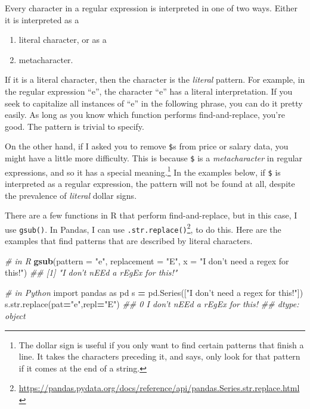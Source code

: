 \documentclass[12pt,krantz2]{krantz}
\makeatletter
\newenvironment{Shaded}{\begin{snugshade}}{\end{snugshade}}
\newcommand{\BuiltInTok}[1]{#1}
\newcommand{\CommentTok}[1]{\textcolor[rgb]{0.37,0.37,0.37}{\textit{#1}}}
\newcommand{\DataTypeTok}[1]{\textcolor[rgb]{0.27,0.27,0.27}{#1}}
\newcommand{\ImportTok}[1]{#1}
\newcommand{\KeywordTok}[1]{\textcolor[rgb]{0.27,0.27,0.27}{\textbf{#1}}}
\newcommand{\NormalTok}[1]{#1}
\newcommand{\OperatorTok}[1]{\textcolor[rgb]{0.43,0.43,0.43}{\textbf{#1}}}
\newcommand{\StringTok}[1]{\textcolor[rgb]{0.5,0.5,0.5}{#1}}
\providecommand{\tightlist}{%
  \setlength{\itemsep}{0pt}\setlength{\parskip}{0pt}}
\renewcommand{\href}[2]{#2\footnote{\url{#1}}}
\newenvironment{kframe}{%
\medskip{}
\setlength{\fboxsep}{.8em}
 \def\at@end@of@kframe{}%
 \ifinner\ifhmode%
  \def\at@end@of@kframe{\end{minipage}}%
  \begin{minipage}{\columnwidth}%
 \fi\fi%
 \def\FrameCommand##1{\hskip\@totalleftmargin \hskip-\fboxsep
 \colorbox{shadecolor}{##1}\hskip-\fboxsep
     \hskip-\linewidth \hskip-\@totalleftmargin \hskip\columnwidth}%
 \MakeFramed {\advance\hsize-\width
   \@totalleftmargin\z@ \linewidth\hsize
   \@setminipage}}%
 {\par\unskip\endMakeFramed%
 \at@end@of@kframe}
\renewenvironment{Shaded}{\begin{kframe}}{\end{kframe}}
\makeatother
\begin{document}
Every character in a regular expression is interpreted in one of two ways. Either it is interpreted as a

\begin{enumerate}
\def\labelenumi{\arabic{enumi}.}
\tightlist
\item
  literal character, or as a
\item
  metacharacter.
\end{enumerate}

If it is a literal character, then the character is the \emph{literal} pattern. For example, in the regular expression ``e'', the character ``e'' has a literal interpretation. If you seek to capitalize all instances of ``e'' in the following phrase, you can do it pretty easily. As long as you know which function performs find-and-replace, you're good. The pattern is trivial to specify.

On the other hand, if I asked you to remove \texttt{\$}s from price or salary data, you might have a little more difficulty. This is because \texttt{\$} is a \emph{metacharacter} in regular expressions, and so it has a special meaning.\footnote{The dollar sign is useful if you only want to find certain patterns that finish a line. It takes the characters preceding it, and says, only look for that pattern if it comes at the end of a string.} In the examples below, if \texttt{\$} is interpreted as a regular expression, the pattern will not be found at all, despite the prevalence of \emph{literal} dollar signs.

There are a few functions in R that perform find-and-replace, but in this case, I use \texttt{gsub()}. In Pandas, I can use \href{https://pandas.pydata.org/docs/reference/api/pandas.Series.str.replace.html}{\texttt{.str.replace()}}, to do this. Here are the examples that find patterns that are described by literal characters.

\begin{Shaded}
\begin{Highlighting}[]
\CommentTok{# in R}
\KeywordTok{gsub}\NormalTok{(}\DataTypeTok{pattern =} \StringTok{"e"}\NormalTok{, }\DataTypeTok{replacement =} \StringTok{"E"}\NormalTok{, }
     \DataTypeTok{x =} \StringTok{"I don't need a regex for this!"}\NormalTok{)}
\CommentTok{## [1] "I don't nEEd a rEgEx for this!"}
\end{Highlighting}
\end{Shaded}

\begin{Shaded}
\begin{Highlighting}[]
\CommentTok{# in Python}
\ImportTok{import}\NormalTok{ pandas }\ImportTok{as}\NormalTok{ pd}
\NormalTok{s }\OperatorTok{=}\NormalTok{ pd.Series([}\StringTok{"I don't need a regex for this!"}\NormalTok{])}
\NormalTok{s.}\BuiltInTok{str}\NormalTok{.replace(pat}\OperatorTok{=}\StringTok{"e"}\NormalTok{,repl}\OperatorTok{=}\StringTok{"E"}\NormalTok{)}
\CommentTok{## 0    I don't nEEd a rEgEx for this!}
\CommentTok{## dtype: object}
\end{Highlighting}
\end{Shaded}
\end{document}
